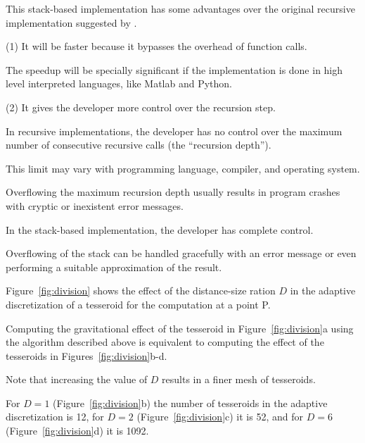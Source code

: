 \documentclass[manuscript]{geophysics}
\begin{document}
This stack-based implementation has some advantages over the original recursive
implementation suggested by \citet{Li2011}.

(1) It will be faster because it bypasses the overhead of function calls.

The speedup will be specially significant if the implementation is done
in high level interpreted languages, like Matlab and Python.

(2) It gives the developer more control over the recursion step.

In recursive implementations,
the developer has no control over the maximum number of consecutive
recursive calls (the ``recursion depth'').

This limit may vary with programming language, compiler, and operating system.

Overflowing the maximum recursion depth usually results in program
crashes with cryptic or inexistent error messages.

In the stack-based implementation, the developer has complete control.

Overflowing of the stack can be handled gracefully with an error message or
even performing a suitable approximation of the result.



Figure~\ref{fig:division} shows the effect of the distance-size ration $D$
in the adaptive discretization of a tesseroid for the computation at a point P.

Computing the gravitational effect of the tesseroid in
Figure~\ref{fig:division}a using the algorithm described above
is equivalent to computing the effect of the tesseroids in
Figures~\ref{fig:division}b-d.

Note that increasing the value of $D$ results in a finer mesh of tesseroids.

For $D = 1$ (Figure~\ref{fig:division}b) the number of tesseroids in the
adaptive discretization is 12,
for $D = 2$ (Figure~\ref{fig:division}c) it is 52,
and for $D = 6$ (Figure~\ref{fig:division}d) it is 1092.
\end{document}

